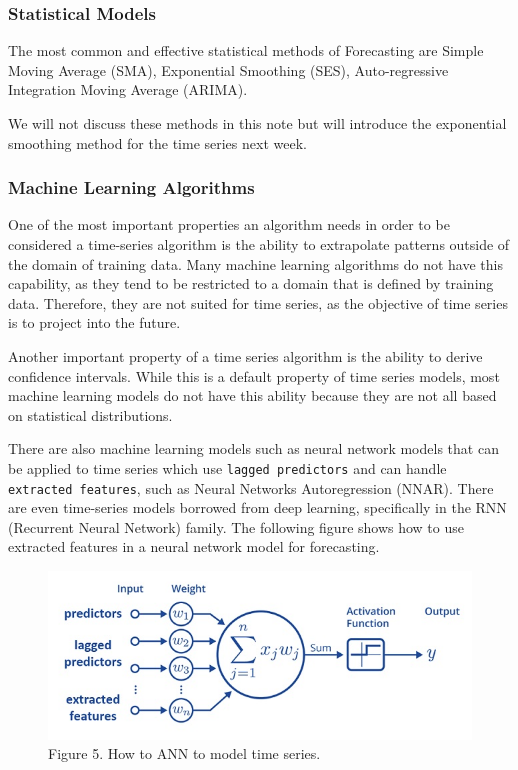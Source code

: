 \documentclass[
]{article}
\begin{document}
\hypertarget{statistical-models}{%
\subsubsection{Statistical Models}\label{statistical-models}}

The most common and effective statistical methods of Forecasting are
Simple Moving Average (SMA), Exponential Smoothing (SES),
Auto-regressive Integration Moving Average (ARIMA).

We will not discuss these methods in this note but will introduce the
exponential smoothing method for the time series next week.

\hypertarget{machine-learning-algorithms}{%
\subsubsection{Machine Learning
Algorithms}\label{machine-learning-algorithms}}

One of the most important properties an algorithm needs in order to be
considered a time-series algorithm is the ability to extrapolate
patterns outside of the domain of training data. Many machine learning
algorithms do not have this capability, as they tend to be restricted to
a domain that is defined by training data. Therefore, they are not
suited for time series, as the objective of time series is to project
into the future.

Another important property of a time series algorithm is the ability to
derive confidence intervals. While this is a default property of time
series models, most machine learning models do not have this ability
because they are not all based on statistical distributions.

There are also machine learning models such as neural network models
that can be applied to time series which use \texttt{lagged\ predictors}
and can handle \texttt{extracted\ features}, such as Neural Networks
Autoregression (NNAR). There are even time-series models borrowed from
deep learning, specifically in the RNN (Recurrent Neural Network)
family. The following figure shows how to use extracted features in a
neural network model for forecasting.

\begin{figure}

{\centering \includegraphics[width=8.83in]{img/w10-ANN-TS} 

}

\caption{Figure 5. How to ANN to model time series.}\label{fig:unnamed-chunk-7}
\end{figure}
\end{document}

